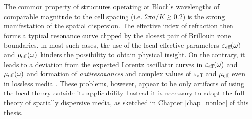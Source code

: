 %	
%

The common property of structures operating at Bloch's wavelengths of comparable magnitude to the cell spacing (i.e. $2\pi a/K \gtrsim 0.2$) is the strong manifestation of the spatial dispersion. The effective index of refraction then forms a typical resonance curve clipped by the closest pair of Brillouin zone boundaries. In most such cases, the use of the local effective parameters $\varepsilon_{\text{eff} }(\omega)$ and $\mu_{\text{eff} }(\omega)$ hinders the possibility to obtain physical insight. On the contrary, it leads to a deviation from the expected Lorentz oscillator curves in $\varepsilon_{\text{eff} }(\omega)$ and $\mu_{\text{eff} }(\omega)$ and formation of \textit{antiresonances} \cite{koschny2003resonant,wallen2011anti} and complex values of $\varepsilon_{\text{eff} }$ and $\mu_{\text{eff} }$ even in lossless media \cite{li2003photonic}. These problems, however, appear to be only artifacts of using the local theory outside its applicability. Instead it is necessary to adopt the full theory of spatially dispersive media, as sketched in Chapter \ref{chap_nonloc} of this thesis.

